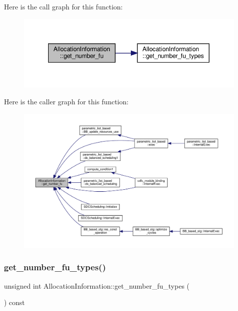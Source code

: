 Here is the call graph for this function\+:
\nopagebreak
\begin{figure}[H]
\begin{center}
\leavevmode
\includegraphics[width=340pt]{d7/d79/classAllocationInformation_a2a8c7fa5894b079fb5f2d76bf32fc9ef_cgraph}
\end{center}
\end{figure}
Here is the caller graph for this function\+:
\nopagebreak
\begin{figure}[H]
\begin{center}
\leavevmode
\includegraphics[width=350pt]{d7/d79/classAllocationInformation_a2a8c7fa5894b079fb5f2d76bf32fc9ef_icgraph}
\end{center}
\end{figure}
\mbox{\label{classAllocationInformation_a65af57d814c6e799706348b32abdb05f}} 
\subsubsection{\texorpdfstring{get\+\_\+number\+\_\+fu\+\_\+types()}{get\_number\_fu\_types()}}
{\footnotesize\ttfamily unsigned int Allocation\+Information\+::get\+\_\+number\+\_\+fu\+\_\+types (\begin{DoxyParamCaption}{ }\end{DoxyParamCaption}) const}



